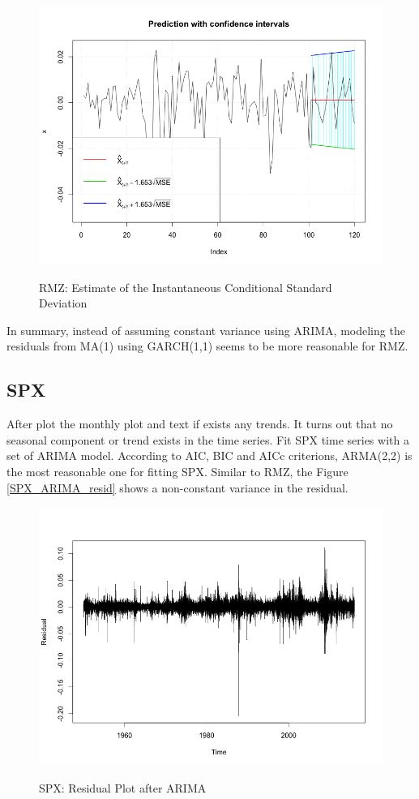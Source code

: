 \documentclass[12pt]{article}
\begin{document}
\begin{figure}
  \caption{RMZ: Estimate of the Instantaneous Conditional Standard Deviation}
  \includegraphics[width = \textwidth]{../results/RMZ_GARCH_predCI}
  \label{fig:RMZ_GARCH_predCI}
\end{figure}

In summary, instead of assuming constant variance using ARIMA, modeling the residuals from MA(1) using GARCH(1,1) seems to be more reasonable for RMZ.

\subsection{SPX}
After plot the monthly plot and text if exists any trends. It turns out that no seasonal component or trend exists in the time series. Fit SPX time series with a set of ARIMA model. According to AIC, BIC and AICc criterions, ARMA(2,2) is the most reasonable one for fitting SPX. Similar to RMZ, the Figure \ref{SPX_ARIMA_resid} shows a non-constant variance in the residual.

\begin{figure}
  \caption{SPX: Residual Plot after ARIMA}
  \includegraphics[width = \textwidth]{../results/SPX_ARIMA_resid}
  \label{fig:SPX_ARIMA_resid}
\end{figure}
\end{document}
